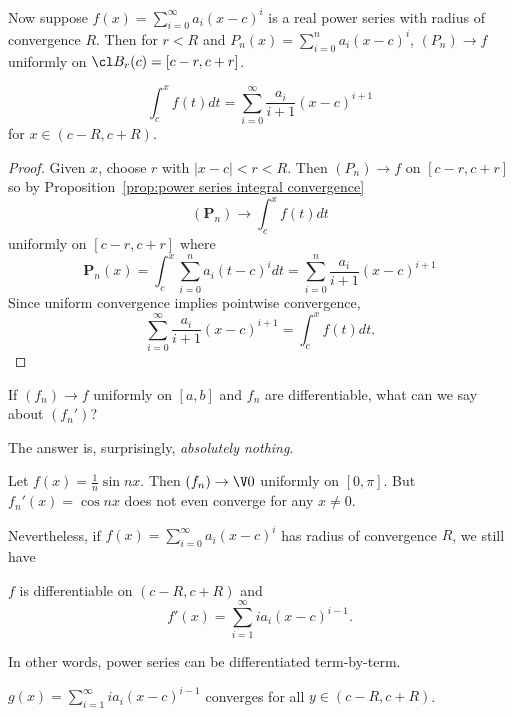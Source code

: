 \documentclass[a4paper]{article}
\theoremstyle{definition}
\begin{document}
Now suppose \(f(x) = \sum_{i=0}^{\infty}a_i(x-c)^i \) is a real power series with radius of convergence \(R\). Then for \(r< R\) and \(P_n(x) = \sum_{i=0}^{n}a_i(x-c)^i \), \((P_n)\to f\) uniformly on \(\cl B_r(c) = [c-r,c+r]\).

\begin{cor}
  \[
    \int_{c}^{x} f(t) dt = \sum_{i=0}^{\infty}\frac{a_i}{i+1}(x-c)^{i+1}
  \]
  for \(x\in (c-R,c+R)\).
\end{cor}

\begin{proof}
  Given \(x\), choose \(r\) with \(|x-c| < r < R\). Then \((P_n)\to f\) on \([c-r, c+r]\) so by Proposition~\ref{prop:power series integral convergence}
  \[
    (\mathbf{P}_n) \to \int_{c}^{x} f(t) dt
  \]
  uniformly on \([c-r, c+r]\) where
  \[
    \mathbf{P}_n(x) = \int_{c}^{x} \sum_{i=0}^{n}a_i(t-c)^i dt = \sum_{i=0}^{n} \frac{a_i}{i+1} (x-c)^{i+1}
  \]
  Since uniform convergence implies pointwise convergence,
  \[
    \sum_{i=0}^{\infty}\frac{a_i}{i+1}(x-c)^{i+1} = \int_{c}^{x} f(t) dt.
  \]
\end{proof}

\begin{question}
  If \((f_n)\to f\) uniformly on \([a,b]\) and \(f_n\) are differentiable, what can we say about \((f_n')\)?
\end{question}

The answer is, surprisingly, \emph{absolutely nothing}.

\begin{eg}
  Let \(f(x) = \frac{1}{n}\sin nx\). Then \((f_n)\to \V 0\) uniformly on \([0,\pi]\). But \(f_n'(x) = \cos nx\) does not even converge for any \(x\neq 0\).
\end{eg}

Nevertheless, if \(f(x) = \sum_{i=0}^{\infty}a_i(x-c)^i \) has radius of convergence \(R\), we still have

\begin{prop}
  \(f\) is differentiable on \((c-R, c+R)\) and
  \[
    f'(x) = \sum_{i=1}^{\infty}i a_i(x-c)^{i-1}. 
  \]
\end{prop}

In other words, power series can be differentiated term-by-term.

\begin{lem}
  \(g(x) = \sum_{i=1}^{\infty}i a_i(x-c)^{i-1} \) converges for all \(y\in(c-R,c+R)\).
\end{lem}
\end{document}
